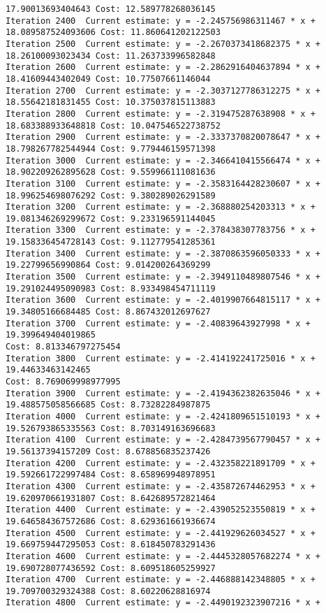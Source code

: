 \documentclass[11pt]{article}
\begin{document}
\begin{Verbatim}[commandchars=\\\{\}]
17.90013693404643 Cost: 12.589778268036145
Iteration 2400  Current estimate: y = -2.245756986311467 * x +
18.089587524093606 Cost: 11.860641202122503
Iteration 2500  Current estimate: y = -2.2670373418682375 * x +
18.26100093023434 Cost: 11.263733996582848
Iteration 2600  Current estimate: y = -2.2862916404637894 * x +
18.41609443402049 Cost: 10.77507661146044
Iteration 2700  Current estimate: y = -2.3037127786312275 * x +
18.55642181831455 Cost: 10.375037815113883
Iteration 2800  Current estimate: y = -2.319475287638908 * x +
18.683388933648818 Cost: 10.047546522738752
Iteration 2900  Current estimate: y = -2.3337370820078647 * x +
18.798267782544944 Cost: 9.779446159571398
Iteration 3000  Current estimate: y = -2.3466410415566474 * x +
18.902209262895628 Cost: 9.559966111081636
Iteration 3100  Current estimate: y = -2.3583164428230607 * x +
18.996254698076292 Cost: 9.380289026291589
Iteration 3200  Current estimate: y = -2.368880254203313 * x +
19.081346269299672 Cost: 9.233196591144045
Iteration 3300  Current estimate: y = -2.378438307783756 * x +
19.158336454728143 Cost: 9.112779541285361
Iteration 3400  Current estimate: y = -2.3870863596050333 * x +
19.22799656990864 Cost: 9.014200264369299
Iteration 3500  Current estimate: y = -2.3949110489807546 * x +
19.291024495090983 Cost: 8.933498454711119
Iteration 3600  Current estimate: y = -2.4019907664815117 * x +
19.34805166684485 Cost: 8.867432012697627
Iteration 3700  Current estimate: y = -2.40839643927998 * x + 19.399649404019865
Cost: 8.813346797275454
Iteration 3800  Current estimate: y = -2.414192241725016 * x + 19.44633463142465
Cost: 8.769069998977995
Iteration 3900  Current estimate: y = -2.4194362382635046 * x +
19.488575058566685 Cost: 8.73282284987875
Iteration 4000  Current estimate: y = -2.4241809651510193 * x +
19.526793865335563 Cost: 8.703149163696683
Iteration 4100  Current estimate: y = -2.4284739567790457 * x +
19.56137394157209 Cost: 8.678856835237426
Iteration 4200  Current estimate: y = -2.432358221891709 * x +
19.592661722997484 Cost: 8.658969948978951
Iteration 4300  Current estimate: y = -2.435872674462953 * x +
19.620970661931807 Cost: 8.642689572821464
Iteration 4400  Current estimate: y = -2.439052523550819 * x +
19.646584367572686 Cost: 8.629361661936674
Iteration 4500  Current estimate: y = -2.441929626034527 * x +
19.669759447295053 Cost: 8.618450783291436
Iteration 4600  Current estimate: y = -2.4445328057682274 * x +
19.690728077436592 Cost: 8.609518605259927
Iteration 4700  Current estimate: y = -2.446888142348805 * x +
19.709700329324388 Cost: 8.60220628816974
Iteration 4800  Current estimate: y = -2.4490192323907216 * x +

\end{Verbatim}
\end{document}
